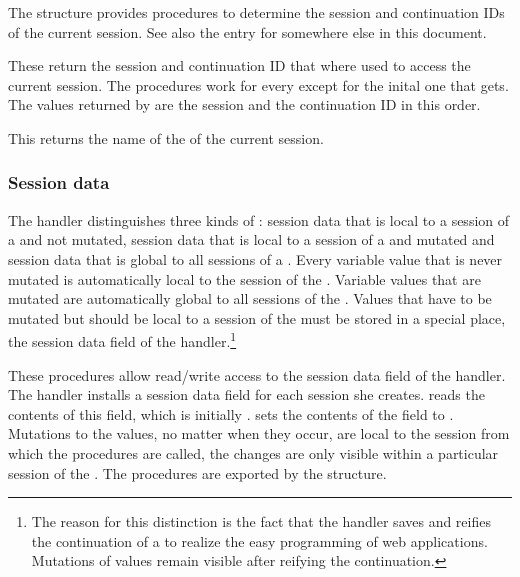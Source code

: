 The  structure provides procedures to determine the
  session and continuation IDs of the current session.  See also the
  entry for  somewhere else in this document.

\begin{desc}
  These return the session and continuation ID that where used to
  access the current session.  The procedures work for every
   except for the inital one that 
  gets.  The values returned by  are the session and the
  continuation ID in this order.
\end{desc}

\begin{desc}
  This returns the name of the \surflet of the current session.
\end{desc}


\subsubsection{Session data}
The \surflet handler distinguishes three kinds of : session data that is local to a session of a \surflet and not
mutated, session data that is local to a session of a \surflet and
mutated and session data that is global to all sessions of a \surflet.
Every variable value that is never mutated is automatically local to
the session of the \surflet.  Variable values that are mutated are
automatically global to all sessions of the \surflet.  Values that
have to be mutated but should be local to a session of the \surflet
must be stored in a special place, the session data field of the
\surflet handler.\footnote{The reason for this distinction is the fact
  that the \surflet handler saves and reifies the continuation of a
  \surflet to realize the easy programming of web applications.
  Mutations of values remain visible after reifying the continuation.}

\begin{desc}
  These procedures allow read/write access to the session data field
  of the \surflet handler.  The \surflet handler installs a session
  data field for each session she creates.  
  reads the contents of this field, which is initially \sharpf.
   sets the contents of the field to
  .  Mutations to the values, no matter when they
  occur, are local to the session from which the procedures are
  called, \ie the changes are only visible within a particular session
  of the \surflet.  The procedures are exported by the
   structure.
\end{desc}


